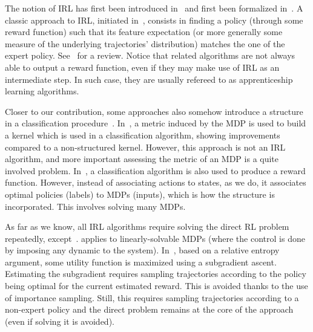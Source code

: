 \documentclass[english,utf8]{./hermes-journal}
\begin{document}
The notion of IRL has first been introduced in~\cite{Russell:1998}
and first been formalized in~\cite{Ng:2000}. A classic approach to
IRL, initiated in~\cite{Abbeel:2004}, consists in finding a policy
(through some reward function) such that its feature expectation (or
more generally some measure of the underlying trajectories'
distribution) matches the one of the expert policy.
%
See~\cite{Neu:2010} for a review.
%
%
Notice that related algorithms are not always able to output a
reward function, even if they may make use of IRL as an intermediate
step. In such case, they are usually refereed to as apprenticeship
learning algorithms.
%

Closer to our contribution, some approaches also somehow introduce a
structure in a classification
procedure~\cite{Melo:2010}\cite{Ratliff:2006}. In~\cite{Melo:2010},
a metric induced by the MDP is used to build a kernel which is used
in a classification algorithm, showing improvements compared to a
non-structured kernel. However, this approach is not an IRL
algorithm, and more important assessing the metric of an MDP is a
quite involved problem. In~\cite{Ratliff:2006}, a classification
algorithm is also used to produce a reward function. However,
instead of associating actions to states, as we do, it associates
optimal policies (labels) to MDPs (inputs), which is how the
structure is incorporated. This involves solving many MDPs.

As far as we know, all IRL algorithms require solving the direct RL
problem repeatedly, except~\cite{Dvij:2010,boularias:2011}.
\cite{Dvij:2010} applies to linearly-solvable MDPs (where the
control is done by imposing any dynamic to the system).
In~\cite{boularias:2011}, based on a relative entropy argument, some
utility function is maximized using a subgradient ascent. Estimating
the subgradient requires sampling trajectories according to the
policy being optimal for the current estimated reward. This is
avoided thanks to the use of importance sampling. Still, this
requires sampling trajectories according to a non-expert policy and
the direct problem remains at the core of the approach (even if
solving it is avoided).
\end{document}
